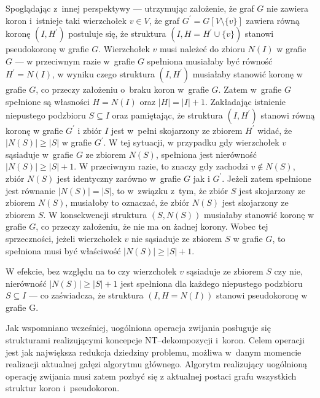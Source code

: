 {\begin{bproof}
    Spoglądając z~innej perspektywy --- utrzymując założenie, że graf $G$ nie zawiera koron i~istnieje taki wierzchołek $v \in V$, że graf $G^\prime= G[V \setminus \{v\}]$ zawiera równą koronę $(I, H^\prime)$ postuluje się, że struktura $(I, H=H^\prime \cup \{v\})$ stanowi pseudokoronę w grafie $G$.
    Wierzchołek $v$ musi należeć do zbioru $N(I)$ w grafie $G$ --- w przeciwnym razie w~grafie $G$ spełniona musiałaby być równość $H^\prime=N(I)$, w wyniku czego struktura $(I, H^\prime)$ musiałaby stanowić koronę w grafie $G$, co przeczy założeniu o~braku koron w~grafie $G$.
    Zatem w~grafie $G$ spełnione są własności $H=N(I)$ oraz $|H|=|I|+1$.
    Zakładając istnienie niepustego podzbioru $S \subseteq I$ oraz pamiętając, że struktura $(I, H^\prime)$ stanowi równą koronę w grafie $G^\prime$ i zbiór $I$ jest w~pełni skojarzony ze zbiorem $H^\prime$ widać, że $|N(S)| \geq |S|$ w grafie $G^\prime$.
    W tej sytuacji, w przypadku gdy wierzchołek $v$ sąsiaduje w~grafie $G$ ze zbiorem $N(S)$, spełniona jest nierówność $|N(S)| \geq |S| + 1$.
    W przeciwnym razie, to znaczy gdy zachodzi $v \notin N(S)$, zbiór $N(S)$ jest identyczny zarówno w~grafie $G$ jak i $G^\prime$.
    Jeżeli zatem spełnione jest równanie $|N(S)|=|S|$, to w~związku z~tym, że zbiór $S$ jest skojarzony ze zbiorem $N(S)$, musiałoby to oznaczać, że zbiór $N(S)$ jest skojarzony ze zbiorem $S$.
    W konsekwencji struktura $(S, N(S))$ musiałaby stanowić koronę w grafie $G$, co przeczy założeniu, że nie ma on żadnej korony.
    Wobec tej sprzeczności, jeżeli wierzchołek $v$ nie sąsiaduje ze zbiorem $S$ w grafie $G$, to spełniona musi być właściwość $|N(S)| \geq |S| + 1$.

    W efekcie, bez względu na to czy wierzchołek $v$ sąsiaduje ze zbiorem $S$ czy nie, nierówność $|N(S)| \geq |S| + 1$ jest spełniona dla każdego niepustego podzbioru $S \subseteq I$ --- co zaświadcza, że struktura $(I, H=N(I))$ stanowi pseudokoronę w grafie G.
  \end{bproof}

  Jak wspomniano wcześniej, uogólniona operacja zwijania posługuje się strukturami realizującymi koncepcje NT--dekompozycji i~koron.
  Celem operacji jest jak największa redukcja dziedziny problemu, możliwa w~danym momencie realizacji aktualnej gałęzi algorytmu głównego.
  Algorytm realizujący uogólnioną operację zwijania musi zatem pozbyć się z aktualnej postaci grafu wszystkich struktur koron i~pseudokoron.

}

